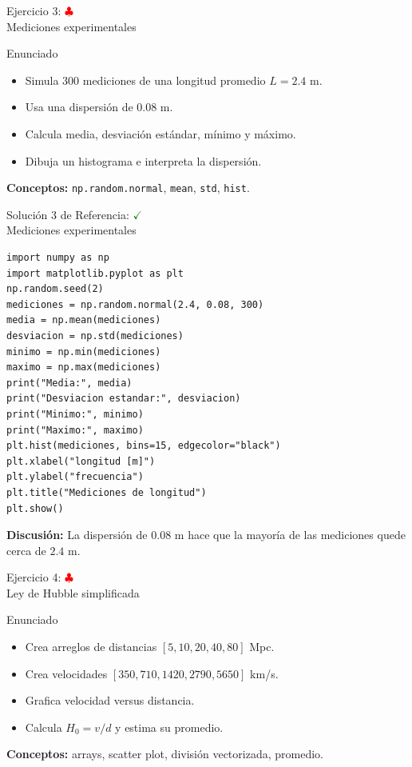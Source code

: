 \documentclass[10pt]{beamer}
\begin{document}
\begin{frame}{Ejercicio 3: \hfill \textcolor{red}{$\clubsuit$} \\ Mediciones experimentales}
\begin{block}{Enunciado}
\begin{itemize}
  \item Simula 300 mediciones de una longitud promedio \(L=2.4\) m.
  \item Usa una dispersión de \(0.08\) m.
  \item Calcula media, desviación estándar, mínimo y máximo.
  \item Dibuja un histograma e interpreta la dispersión.
\end{itemize}
\end{block}
\textbf{Conceptos:} \texttt{np.random.normal}, \texttt{mean}, \texttt{std}, \texttt{hist}.
\end{frame}

\begin{solutionblock}
\begin{frame}[fragile]{Solución 3 de Referencia: \hfill \textcolor{green}{$\checkmark$} \\ Mediciones experimentales}
\begin{verbatim}
import numpy as np
import matplotlib.pyplot as plt
np.random.seed(2)
mediciones = np.random.normal(2.4, 0.08, 300)
media = np.mean(mediciones)
desviacion = np.std(mediciones)
minimo = np.min(mediciones)
maximo = np.max(mediciones)
print("Media:", media)
print("Desviacion estandar:", desviacion)
print("Minimo:", minimo)
print("Maximo:", maximo)
plt.hist(mediciones, bins=15, edgecolor="black")
plt.xlabel("longitud [m]")
plt.ylabel("frecuencia")
plt.title("Mediciones de longitud")
plt.show()
\end{verbatim}
\textbf{Discusión:} La dispersión de \(0.08\) m hace que la mayoría de las mediciones quede cerca de \(2.4\) m.
\end{frame}
\end{solutionblock}

\begin{frame}{Ejercicio 4: \hfill \textcolor{red}{$\clubsuit$} \\ Ley de Hubble simplificada}
\begin{block}{Enunciado}
\begin{itemize}
  \item Crea arreglos de distancias \([5,10,20,40,80]\) Mpc.
  \item Crea velocidades \([350,710,1420,2790,5650]\) km/s.
  \item Grafica velocidad versus distancia.
  \item Calcula \(H_0=v/d\) y estima su promedio.
\end{itemize}
\end{block}
\textbf{Conceptos:} arrays, scatter plot, división vectorizada, promedio.
\end{frame}
\end{document}
